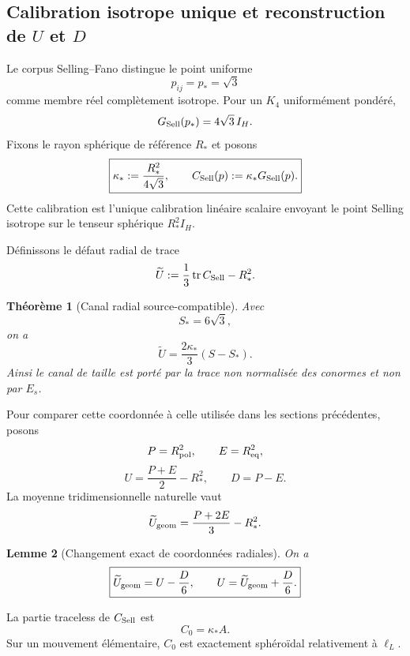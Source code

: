 \documentclass[11pt,a4paper]{article}
\newtheorem{theorem}{Théorème}[section]
\newtheorem{lemma}[theorem]{Lemme}
\begin{document}
\subsection{Calibration isotrope unique et reconstruction de $U$ et $D$}

Le corpus Selling--Fano distingue le point uniforme
\[
 p_{ij}=p_*=\sqrt3
\]
comme membre réel complètement isotrope. Pour un $K_4$ uniformément pondéré,
\[
 G_{\rm Sell}(p_*)=4\sqrt3\,I_H.
\]
Fixons le rayon sphérique de référence $R_*$ et posons
\begin{equation}\label{eq:v13-kappa}
 \boxed{
 \kappa_*:=\frac{R_*^2}{4\sqrt3},
 \qquad
 C_{\rm Sell}(p):=\kappa_*G_{\rm Sell}(p).}
\end{equation}
Cette calibration est l'unique calibration linéaire scalaire envoyant le point Selling isotrope sur le tenseur sphérique $R_*^2I_H$.

Définissons le défaut radial de trace
\begin{equation}\label{eq:v13-Utrace}
 \widetilde U
 :=
 \frac13\operatorname{tr}C_{\rm Sell}-R_*^2.
\end{equation}

\begin{theorem}[Canal radial source-compatible]\label{thm:v13-Utrace}
Avec
\[
 S_*=6\sqrt3,
\]
on a
\begin{equation}\label{eq:v13-Utrace-explicit}
 \boxed{
 \widetilde U
 =
 \frac{2\kappa_*}{3}(S-S_*).}
\end{equation}
Ainsi le canal de taille est porté par la trace non normalisée des conormes et non par $E_s$.
\end{theorem}

Pour comparer cette coordonnée à celle utilisée dans les sections précédentes, posons
\[
 P=R_{\rm pol}^2,\qquad E=R_{\rm eq}^2,
\]
\[
 U=\frac{P+E}{2}-R_*^2,\qquad D=P-E.
\]
La moyenne tridimensionnelle naturelle vaut
\[
 \widetilde U_{\rm geom}
 =
 \frac{P+2E}{3}-R_*^2.
\]

\begin{lemma}[Changement exact de coordonnées radiales]\label{lem:v13-U-change}
On a
\begin{equation}\label{eq:v13-U-change}
 \boxed{
 \widetilde U_{\rm geom}=U-\frac{D}{6},
 \qquad
 U=\widetilde U_{\rm geom}+\frac{D}{6}.}
\end{equation}
\end{lemma}

La partie traceless de $C_{\rm Sell}$ est
\[
 C_0=\kappa_*A.
\]
Sur un mouvement élémentaire, $C_0$ est exactement sphéroïdal relativement à $\ell_L$.
\end{document}
